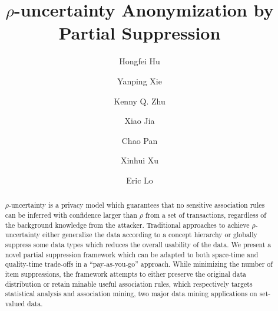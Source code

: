 \documentclass[smallextended]{svjour3}
\begin{document}
\title{$\rho$-uncertainty Anonymization by Partial Suppression}

\author{
Hongfei Hu
\and Yanping Xie
\and Kenny Q. Zhu
\and Xiao Jia
\and Chao Pan
\and Xinhui Xu
\and Eric Lo
}

\maketitle

\begin{abstract}
$\rho$-uncertainty is a privacy model which guarantees that
no sensitive association rules can be inferred with confidence
larger than $\rho$ from a set of transactions, regardless of
the background knowledge from the attacker.
Traditional approaches to achieve $\rho$-uncertainty either
generalize the data according to a concept hierarchy or globally
suppress some data types which reduces the overall usability of the
data. We present a novel partial suppression framework
which can be adapted to both space-time and quality-time
trade-offs in a ``pay-as-you-go'' approach.
While minimizing the number of item suppressions,
the framework attempts to either preserve the
original data distribution or retain minable useful
association rules,
which respectively targets statistical analysis and
association mining,
two major data mining applications on set-valued data.
\end{abstract}









\end{document}
